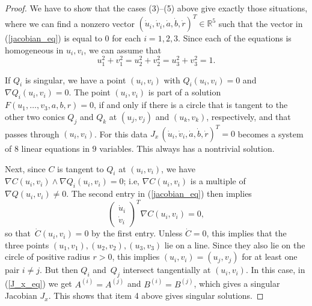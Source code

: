\documentclass[12pt]{amsart}
\theoremstyle{definition}
\theoremstyle{definition}
\numberwithin{equation}{section}
\begin{document}
\begin{proof}
We have to show that the cases (3)--(5) above give exactly those situations, where we can find a nonzero vector $(\dot u_i,
\dot v_i,
\dot a,
\dot b,
\dot r)^T \in\mathbb R^5$ such that the vector in (\ref{jacobian_eq}) is equal to $0$ for each $i=1,2,3$. Since each of the equations is homogeneous in $u_i,v_i$, we can assume that
\begin{equation}\label{eq1}u_1^2 + v_1^2 = u_2^2 + v_2^2 =u_3^2 + v_3^2 =1.\end{equation}

If $Q_i$ is singular, we have a point $(u_i,v_i)$ with $Q_i(u_i,v_i)=0$ and $\nabla Q_i(u_i,v_i)=0$. The point $(u_i,v_i)$ is part of a solution $F(u_1,\ldots, v_3,a,b,r)=0$, if and only if there is a circle that is tangent to the other two conics $Q_j$ and $Q_k$ at $(u_j,v_j)$ and $(u_k,v_k)$, respectively, and that passes through $(u_i,v_i)$. 
For this data $J_x \,(
\dot u_i,
\dot v_i,
\dot a,
\dot b,
\dot r)^T=0$ becomes a system of $8$ linear equations in $9$ variables. This always has a nontrivial solution. 


Next, since $C$ is tangent to $Q_i$ at $(u_i,v_i)$, we have $\nabla C(u_i,v_i)\wedge \nabla Q_i(u_i,v_i) = 0$; i.e, $\nabla C(u_i,v_i)$ is a multiple of~$\nabla Q(u_i,v_i)\neq 0$. The second entry in (\ref{jacobian_eq}) then implies 
$$\begin{pmatrix}\dot u_i \\ \dot v_i \end{pmatrix}^T \nabla C(u_i,v_i)=0,$$
so that~$\dot C(u_i,v_i)=0$ by the first entry. Unless $\dot C=0$, this implies that the three points $(u_1,v_1),(u_2,v_2),(u_3,v_3)$ lie on a line. Since they also lie on the circle of positive radius $r>0$, this implies $(u_i,v_i)=(u_j,v_j)$ for at least one pair $i\neq j$. But then $Q_i$ and~$Q_j$ intersect tangentially at $(u_i,v_i)$. In this case, in (\ref{J_x_eq}) we get $A^{(i)} = A^{(j)}$ and $B^{(i)} = B^{(j)}$, which gives a singular Jacobian $J_x$. This shows that item 4 above gives singular solutions.


\end{proof}
\end{document}
